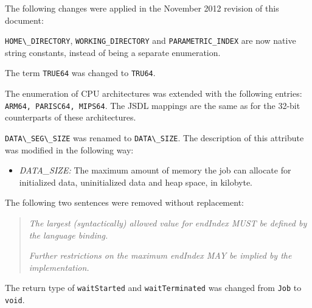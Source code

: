 \documentclass{article}
\newcommand{\h}[1]{\lstinline|#1|}
\begin{document}
The following changes were applied in the November 2012 revision of this document:

\h{HOME\_DIRECTORY}, \h{WORKING_DIRECTORY} and \h{PARAMETRIC_INDEX} are now native string constants, instead of being a separate enumeration.

The term \h{TRUE64} was changed to \h{TRU64}.

The enumeration of CPU architectures was extended with the following entries: \h{ARM64, PARISC64, MIPS64}. The JSDL mappings are the same as for the 32-bit counterparts of these architectures.

\h{DATA\_SEG\_SIZE} was renamed to \h{DATA\_SIZE}. The description of this attribute was modified in the following way:

\begin{itemize}
\item \emph{DATA\_SIZE:} The maximum amount of memory the job can allocate for initialized data, uninitialized data and heap space, in kilobyte.
\end{itemize}

The following two sentences were removed without replacement:

\begin{quote}
\emph{The largest (syntactically) allowed value for endIndex MUST be defined by the language binding.}

\emph{Further restrictions on the maximum endIndex MAY be implied by the implementation.}
\end{quote}

The return type of \h{waitStarted} and \h{waitTerminated} was changed from \h{Job} to \h{void}.
\end{document}
